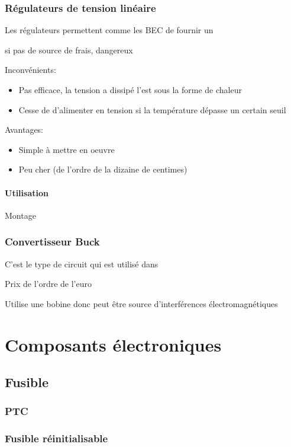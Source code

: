 \documentclass[a4paper, 11pt]{report}
\begin{document}
\subsection{Régulateurs de tension linéaire}
Les régulateurs permettent comme les BEC de fournir un

si pas de source de frais, dangereux

Inconvénients:
\begin{itemize}
\item Pas efficace, la tension a dissipé l'est sous la forme de chaleur
\item Cesse de d'alimenter en tension si la température dépasse un certain seuil
\end{itemize}

Avantages:
\begin{itemize}
\item Simple à mettre en oeuvre
\item Peu cher (de l'ordre de la dizaine de centimes)
\end{itemize}

\subsubsection{Utilisation}

Montage

\subsection{Convertisseur Buck}
C'est le type de circuit qui est utilisé dans 

Prix de l'ordre de l'euro

Utilise une bobine donc peut être source d'interférences électromagnétiques

\chapter{Composants électroniques}

\section{Fusible}

\subsection{PTC}

\subsection{Fusible réinitialisable}
\end{document}
